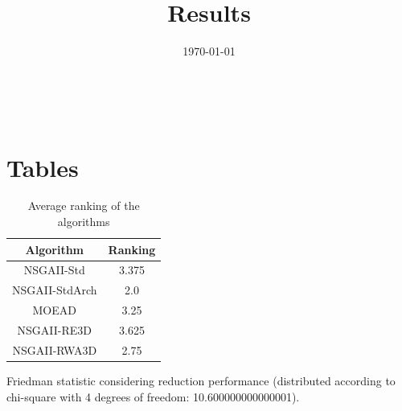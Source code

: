 \documentclass{article}
\title{Results}
\author{}
\date{\today}
\begin{document}
\oddsidemargin 0in \topmargin 0in\maketitle
\
\section{Tables}
\begin{table}[!htp]
\centering
\caption{Average ranking of the algorithms}
\begin{tabular}{c|c}
Algorithm&Ranking\\
\hline
NSGAII-Std&3.375\\
NSGAII-StdArch&2.0\\
MOEAD&3.25\\
NSGAII-RE3D&3.625\\
NSGAII-RWA3D&2.75\\
\end{tabular}
\end{table}


Friedman statistic considering reduction performance (distributed according to chi-square with 4 degrees of freedom: 10.600000000000001).
\end{document}
